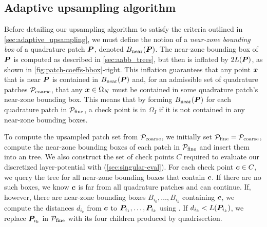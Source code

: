 \subsection{Adaptive upsampling algorithm \label{sec:adaptive_upsampling_algo}}
Before detailing our upsampling algorithm to satisfy the criteria outlined in \cref{sec:adaptive_upsampling}, we must define the notion of a \textit{near-zone bounding box} of a quadrature patch ${\bm{P}}$, denoted $B_{\mathrm{near}}({\bm{P}})$.
The near-zone bounding box of ${\bm{P}}$ is computed as described in \cref{sec:aabb_trees}, but then is inflated by $2L({\bm{P}})$, as shown in \cref{fig:patch-coeffs-bbox}-right.
This inflation guarantees that any point ${\bm{x}}$ that is near ${\bm{P}}$ is contained in $B_{\mathrm{near}}({\bm{P}})$ and, for an admissible set of quadrature patches ${\mathcal{P}_{\mathrm{coarse}}}$, that any ${\bm{x}}\in \Omega_N$ must be contained in some quadrature patch's near-zone bounding box.
This means that by forming $B_{\mathrm{near}}({\bm{P}})$ for each quadrature patch in ${\mathcal{P}_{\mathrm{fine}}}$, a check point is in $\Omega_I$ if it is not contained in any near-zone bounding boxes.

To compute the upsampled patch set from ${\mathcal{P}_{\mathrm{coarse}}}$, we initially set ${\mathcal{P}_{\mathrm{fine}}} = {\mathcal{P}_{\mathrm{coarse}}}$, compute the near-zone bounding boxes of each patch in ${\mathcal{P}_{\mathrm{fine}}}$ and insert them into an \aabb tree.
We also construct the set of check points $C$ required to evaluate our discretized layer-potential with \qbkix (\cref{sec:singular-eval}).
For each check point ${\bm{c}} \in C$, we query the \aabb tree for all near-zone bounding boxes that contain ${\bm{c}}$.
If there are no such boxes, we know ${\bm{c}}$ is far from all quadrature patches and can continue.
If, however, there are near-zone bounding boxes $B_{i_0},\hdots, B_{i_k}$ containing ${\bm{c}}$, we compute the distances $d_{i_k}$ from ${\bm{c}}$ to ${\bm{P}}_{i_1},\hdots,{\bm{P}}_{i_k}$ using \cite[Section 2]{morse2020bsupplementary}.
If $d_{i_k} < L({\bm{P}}_{i_k})$, we replace ${\bm{P}}_{i_k}$ in ${\mathcal{P}_{\mathrm{fine}}}$ with its four children produced by quadrisection.


